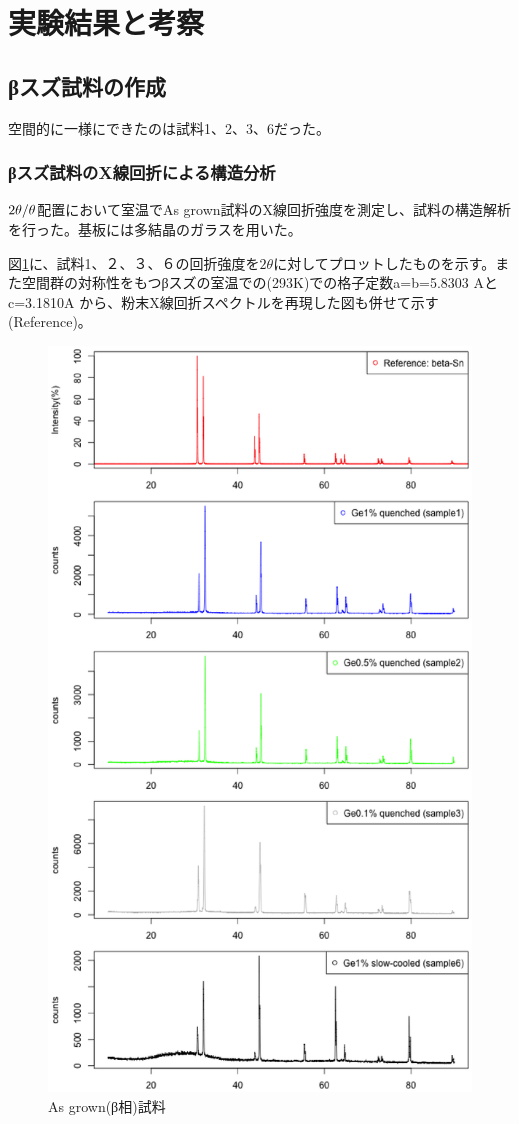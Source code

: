 \section{実験結果と考察}

\subsection{βスズ試料の作成}
空間的に一様にできたのは試料1、2、3、6だった。

\subsubsection{βスズ試料のX線回折による構造分析}
$\rm 2\theta/\theta$配置において室温でAs grown試料のX線回折強度を測定し、試料の構造解析を行った。基板には多結晶のガラスを用いた。

図\ref{fig:intensity_asgrown_samples}に、試料1、２、３、６の回折強度を$2\theta$に対してプロットしたものを示す。また空間群の対称性をもつβスズの室温での(293K)での格子定数a=b=5.8303 Aとc=3.1810A \cite{Wolcyrz}から、粉末X線回折スペクトルを再現した図も併せて示す(Reference)。
\begin{figure}[!h]
    \begin{center}
   \includegraphics[width=0.8\hsize]{results_discussions/intensity_asgrown_samples.eps}
  \end{center}
  \caption{As grown(β相)試料}
  \label{fig:intensity_asgrown_samples}
\end{figure}

